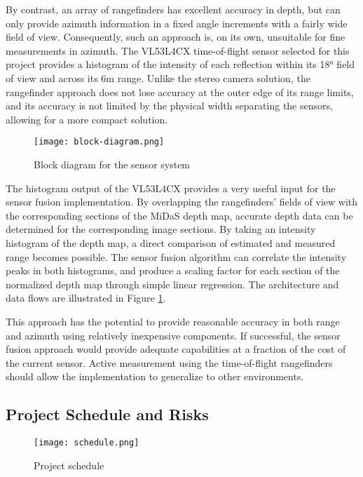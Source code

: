 \documentclass[conference]{IEEEtran}
\begin{document}
By contrast, an array of rangefinders has excellent accuracy in depth, but can
only provide azimuth information in a fixed angle increments with a fairly wide
field of view. Consequently, such an approach is, on its own, unsuitable for
fine measurements in azimuth. The VL53L4CX time-of-flight sensor selected for
this project provides a histogram of the intensity of each reflection within
its 18° field of view and across its 6m range. Unlike the stereo camera
solution, the rangefinder approach does not lose accuracy at the outer edge of
its range limits, and its accuracy is not limited by the physical width
separating the sensors, allowing for a more compact solution.

\begin{figure}
\centering
\texttt{[image: block-diagram.png]}
\caption{Block diagram for the sensor system}
\label{fig:block-diagram}
\end{figure}


The histogram output of the VL53L4CX provides a very useful input for the
sensor fusion implementation. By overlapping the rangefinders' fields of view
with the corresponding sections of the MiDaS depth map, accurate depth data can
be determined for the corresponding image sections. By taking an intensity
histogram of the depth map, a direct comparison of estimated and measured range
becomes possible. The sensor fusion algorithm can correlate the intensity peaks
in both histograms, and produce a scaling factor for each section of the
normalized depth map through simple linear regression. The architecture and
data flows are illustrated in Figure \ref{fig:block-diagram}.

This approach has the potential to provide reasonable accuracy in both range
and azimuth using relatively inexpensive components. If successful, the sensor
fusion approach would provide adequate capabilities at a fraction of the cost
of the current sensor. Active measurement using the time-of-flight rangefinders
should allow the implementation to generalize to other environments.

\FloatBarrier

\subsection{Project Schedule and Risks}

\FloatBarrier

\begin{figure}
\centering
\texttt{[image: schedule.png]}
\caption{Project schedule}
\label{fig:schedule}
\end{figure}
\end{document}
